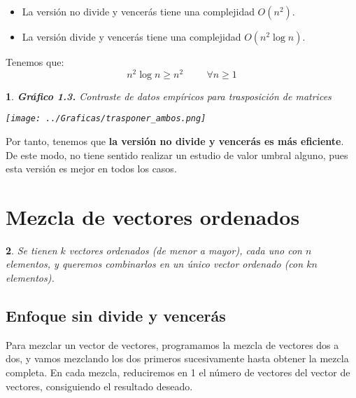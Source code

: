 \documentclass[10pt, a4paper]{article}
\theoremstyle{theorem-style}
\newtheorem*{datos}{}
\theoremstyle{theorem-style}
\theoremstyle{definition-style}
\theoremstyle{remark-style}
\theoremstyle{example-style}
\theoremstyle{definition-style}
\theoremstyle{remark-style}
\begin{document}
\begin{itemize}
	\item La versión no divide y vencerás tiene una complejidad $O(n^2)$.
	\item La versión divide y vencerás tiene una complejidad $O(n^2 \log n)$.
\end{itemize}

Tenemos que:
$$n^2 \log n \geq n^2 \hspace{1cm}\forall n\geq 1$$


\begin{datos}
	{\bf\sffamily Gráfico 1.3.} {\sffamily Contraste de datos empíricos para trasposición de matrices}\\
	\vspace{-0.7cm}
	\begin{center}
		\texttt{[image: ../Graficas/trasponer\_ambos.png]}
	\end{center}	
\end{datos}


Por tanto, tenemos que \textbf{la versión no divide y vencerás es más eficiente}. De este modo, no tiene sentido realizar un estudio de valor umbral alguno, pues esta versión es mejor en todos los casos.

\pagebreak

\section{Mezcla de vectores ordenados}

\begin{datos}
	{\sffamily Se tienen $k$ vectores ordenados (de menor a mayor), cada uno con $n$ elementos, y queremos combinarlos en un único vector ordenado (con $kn$ elementos).}
\end{datos}

\subsection{Enfoque sin divide y vencerás}

Para mezclar un vector de vectores, programamos la mezcla de vectores dos a dos, y vamos mezclando los dos primeros sucesivamente hasta obtener la mezcla completa. En cada mezcla, reduciremos en 1 el número de vectores del vector de vectores, consiguiendo el resultado deseado.\\
\end{document}
